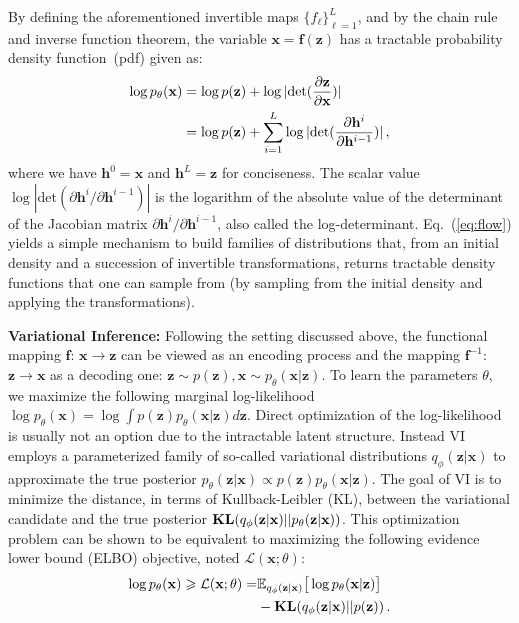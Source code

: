 \documentclass[twoside]{article}
\begin{document}
By defining the aforementioned invertible maps $\{f_{\ell} \}_{\ell =1}^L$, and by the chain rule and inverse function theorem, the variable $\mathbf{x}=\mathbf{f}(\mathbf{z})$ has a tractable probability density function~(pdf) given as:
\begin{align}\label{eq:flow}
\log p_\theta(\mathbf{x})& = \log p(\mathbf{z})  + \log | \text{det} ( \frac{\partial \mathbf{z} }{\partial \mathbf{x}} ) | 
\\\notag
& =  \log p(\mathbf{z}) + \sum_{i=1}^L\log | \text{det} ( \frac{\partial \mathbf{h}^i } {\partial \mathbf{h}^{i-1}}) | \, ,
\end{align}
where we have $\mathbf{h}^0 = \mathbf{x}$ and $\mathbf{h}^L = \mathbf{z}$ for conciseness. 
The scalar value $\log |\text{det}( \partial \mathbf{h}^i/\partial \mathbf{h}^{i-1})|$ is the logarithm of the absolute value of the determinant of the Jacobian matrix $\partial \mathbf{h}^i/\partial \mathbf{h}^{i-1}$, also called the log-determinant. 
Eq.~(\ref{eq:flow}) yields a simple mechanism to build families of distributions that, from an initial density and a succession of invertible transformations, returns tractable density functions that one can sample from (by sampling from the initial density and applying the transformations).

\vspace{0.08in}
\textbf{Variational Inference:}
Following the setting discussed above, the functional mapping $\mathbf{f}$: $\mathbf{x} \xrightarrow{} \mathbf{z}$ can be viewed as an encoding process and the mapping $\mathbf{f}^{-1}$: $\mathbf{z} \xrightarrow{} \mathbf{x}$ as a decoding one: $\mathbf{z} \sim p(\mathbf{z}), \mathbf{x} \sim p_\theta(\mathbf{x}|\mathbf{z}).$
To learn the parameters $\theta$, we maximize the following marginal log-likelihood $ \log p_\theta(\mathbf{x}) = \log \int p(\mathbf{z})  p_\theta(\mathbf{x}|\mathbf{z})d\mathbf{z}$.
Direct optimization of the log-likelihood is usually not an option due to the intractable latent structure. Instead VI employs a parameterized family of so-called variational distributions $q_\phi(\mathbf{z}|\mathbf{x})$ to approximate the true posterior $p_\theta(\mathbf{z}|\mathbf{x}) \varpropto  p(\mathbf{z})  p_\theta(\mathbf{x}|\mathbf{z})$.
The goal of VI is to minimize the distance, in terms of Kullback-Leibler (KL), between the variational candidate and the true posterior $\textbf{\text{KL}}(q_\phi(\mathbf{z}|\mathbf{x})||p_\theta(\mathbf{z}|\mathbf{x}) )$.
This optimization problem can be shown to be equivalent to maximizing the following evidence lower bound (ELBO) objective, noted $\mathcal{L}(\mathbf{x}; \theta)$: 
\begin{align}\label{eq:vi_elbo}
    \log p_\theta(\mathbf{x})
    \geqslant \mathcal{L}(\mathbf{x}; \theta) =&\mathbb{E}_{q_\phi(\mathbf{z}|\mathbf{x})} \big[\log p_\theta(\mathbf{x}|\mathbf{z}) \big] \\ \notag
     &- \textbf{\text{KL}}(q_\phi(\mathbf{z}|\mathbf{x})||p(\mathbf{z}))\, .
\end{align}
\end{document}
